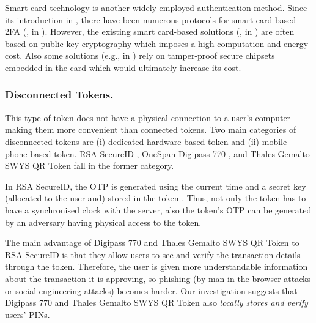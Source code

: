 Smart card technology is another widely employed authentication method. Since its introduction in \cite{chang1991remote}, there have been numerous protocols for smart card-based 2FA (\eg, in \cite{gupta2021machine,WangW18,radhakrishnan2022dependable}). %
%
However, the existing smart card-based solutions (\eg, in \cite{gupta2021machine,WangW18,radhakrishnan2022dependable}) are often based on public-key cryptography which imposes a high computation and energy cost. Also some solutions (e.g., in \cite{kim2009more}) rely on tamper-proof secure chipsets embedded in the card which would ultimately increase its cost. 







\subsubsection{Disconnected Tokens.}

This type of token does not have a physical connection to a user's computer making them more convenient than connected tokens. 
%
%
Two main categories of disconnected tokens are (i) dedicated hardware-based token and (ii) mobile phone-based token. 
%
RSA SecureID \cite{secureID}, OneSpan Digipass 770 \cite{Digipass-website}, and Thales Gemalto SWYS QR Token  \cite{Gemalto} fall in the former category. 



In RSA SecureID, the OTP is generated using the current time and a secret key (allocated to the user and) stored in the token \cite{biryukov2003cryptanalysis}. Thus, not only the token has to have a synchronised clock with the server, also the token's OTP can be generated by an adversary having physical access to the token.%

The main advantage of  Digipass 770 and Thales Gemalto SWYS QR Token to RSA SecureID is that they allow users to see and verify the transaction details through the token. Therefore, the user is given more understandable information about the transaction it is approving,
so phishing (by man-in-the-browser attacks or social engineering attacks) becomes harder. Our investigation suggests that Digipass 770 and Thales Gemalto SWYS QR Token also \emph{locally stores and verify} users' PINs. 




